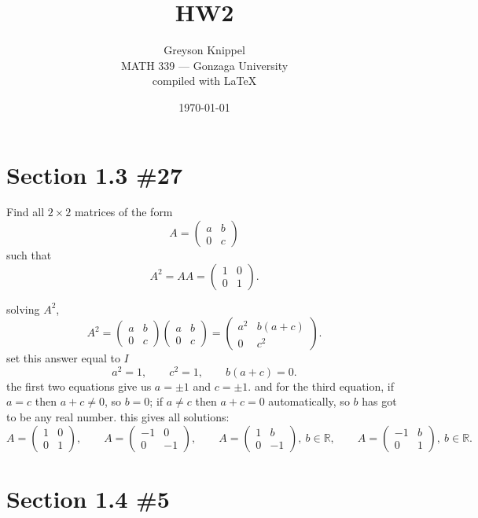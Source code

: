 \documentclass[12pt]{article}
\title{HW2}
\author{
Greyson Knippel \\[4pt]
MATH 339 --- Gonzaga University \\[4pt]
compiled with \LaTeX{}
}
\date{\today}
\begin{document}
\maketitle

\section*{Section 1.3 \#27}

Find all $2 \times 2$ matrices of the form
\[
A = \begin{pmatrix} a & b \\ 0 & c \end{pmatrix}
\]
such that
\[
A^2 = AA = \begin{pmatrix} 1 & 0 \\ 0 & 1 \end{pmatrix}.
\]

solving $A^2$,
\[
A^2 = \begin{pmatrix} a & b \\ 0 & c \end{pmatrix}\begin{pmatrix} a & b \\ 0 & c \end{pmatrix} = \begin{pmatrix} a^2 & b(a+c) \\ 0 & c^2 \end{pmatrix}.
\]
set this answer equal to $I$
\[
a^2 = 1, \qquad c^2 = 1, \qquad b(a+c) = 0.
\]
the first two equations give us $a = \pm 1$ and $c = \pm 1$. and for the third equation, if $a = c$ then $a + c \neq 0$, so $b = 0$; if $a \neq c$ then $a + c = 0$ automatically, so $b$ has got to be any real number. this gives all solutions:
\[
A = \begin{pmatrix} 1 & 0 \\ 0 & 1 \end{pmatrix}, \qquad
A = \begin{pmatrix} -1 & 0 \\ 0 & -1 \end{pmatrix}, \qquad
A = \begin{pmatrix} 1 & b \\ 0 & -1 \end{pmatrix},\ b \in \mathbb{R}, \qquad
A = \begin{pmatrix} -1 & b \\ 0 & 1 \end{pmatrix},\ b \in \mathbb{R}.
\]

\section*{Section 1.4 \#5}
\end{document}
